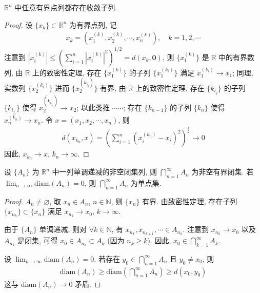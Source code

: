 \documentclass[../../main.tex]{subfiles}
\begin{document}
\begin{theorem}[致密性定理]\label{theorem:致密性定理}
$\mathbb{R}^n$ 中任意有界点列都存在收敛子列.
\end{theorem}
\begin{proof}
设 $\{x_k\} \subset \mathbb{R}^n$ 为有界点列, 记
\begin{align*}
x_k = (x_1^{(k)}, x_2^{(k)}, \cdots, x_n^{(k)}), \quad k = 1, 2, \cdots
\end{align*}
注意到 $|x_i^{(k)}| \leqslant \left(\sum_{i = 1}^{n}|x_i^{(k)}|^2\right)^{1/2} = d(x_k, \mathbf{0})$, 则 $\{x_1^{(k)}\}$ 是 $\mathbb{R}$ 中的有界数列, 由 $\mathbb{R}$ 上的致密性定理, 存在 $\{x_1^{(k)}\}$ 的子列 $\{x_1^{(k_i)}\}$ 满足 $x_1^{(k_i)} \to x_1$; 同理, 实数列 $\{x_2^{(k_i)}\}$ 进而 $\{x_2^{(k_{i_j})}\}$ 有界, 由 $\mathbb{R}$ 上的致密性定理, 存在 $\{k_{i_j}\}$ 的子列 $\{k_{i_{j_l}}\}$ 使得 $x_2^{(k_{i_{j_l}})} \to x_2$; 以此类推 $\cdots\cdots$; 存在 $\{k_{n - 1}\}$ 的子列 $\{k_n\}$ 使得 $x_n^{(k_n)} \to x_n$. 令 $x = (x_1, x_2, \cdots, x_n)$, 则
\begin{align*}
d(x_{k_n}, x) = \left(\sum_{i = 1}^{n}(x_i^{(k_n)} - x_i)^2\right)^{\frac{1}{2}} \to 0
\end{align*}
因此, $x_{k_n} \to x$, $k_n \to \infty$.

\end{proof}

\begin{theorem}[闭集套定理]\label{theorem:闭集套定理}
设 $\{A_n\}$ 为 $\mathbb{R}^n$ 中一列单调递减的非空闭集列, 则 $\bigcap_{n = 1}^{\infty} A_n$ 为非空有界闭集. 若 $\lim_{n \to \infty} \mathrm{diam}(A_n) = 0$, 则 $\bigcap_{n = 1}^{\infty} A_n$ 为单点集.
\end{theorem}
\begin{proof}
$A_n \neq \varnothing$, 取 $x_n \in A_n$, $n \in \mathbb{N}$, 则 $\{x_n\}$ 有界. 由致密性定理, 存在子列 $\{x_{n_k}\} \subset \{x_n\}$ 满足 $x_{n_k} \to x_0$, $k \to \infty$.

由于 $\{A_n\}$ 单调递减, 则对 $\forall k \in \mathbb{N}$, 有 $x_{n_k}, x_{n_{k + 1}}, \cdots \in A_{n_k}$. 注意到 $x_{n_k} \to x_0$ 以及 $A_{n_k}$ 是闭集, 可得 $x_0 \in A_{n_k} \subset A_k$ (因为 $n_k \geqslant k$). 因此, $x_0 \in \bigcap_{k = 1}^{\infty} A_k$.

设 $\lim_{n \to \infty} \mathrm{diam}(A_n) = 0$. 若存在 $y_0 \in \bigcap_{n = 1}^{\infty} A_n$ 且 $y_0 \neq x_0$, 则
\begin{align*}
\mathrm{diam}(A_n) \geqslant \mathrm{diam}\left(\bigcap_{n = 1}^{\infty} A_n\right) \geqslant d(x_0, y_0)
\end{align*}
这与 $\mathrm{diam}(A_n) \to 0$ 矛盾. 

\end{proof}
\end{document}
